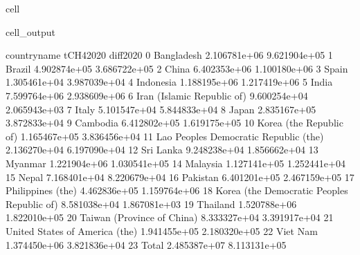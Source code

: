 \documentclass[letterpaper,10pt,english]{jupyterBook}
\begin{document}
\begin{sphinxuseclass}{cell}
\begin{sphinxVerbatimOutput}
\begin{sphinxuseclass}{cell_output}
\begin{sphinxVerbatim}[commandchars=\\\{\}]
                                   country\PYGZus{}name     tCH4\PYGZus{}2020     diff\PYGZus{}2020  \PYGZbs{}
0                                    Bangladesh  2.106781e+06 \PYGZhy{}9.621904e+05   
1                                        Brazil  4.902874e+05 \PYGZhy{}3.686722e+05   
2                                         China  6.402353e+06 \PYGZhy{}1.100180e+06   
3                                         Spain  1.305461e+04  3.987039e+04   
4                                     Indonesia  1.188195e+06  1.217419e+06   
5                                         India  7.599764e+06 \PYGZhy{}2.938609e+06   
6                    Iran (Islamic Republic of)  9.600254e+04 \PYGZhy{}2.065943e+03   
7                                         Italy  5.101547e+04  5.844833e+04   
8                                         Japan  2.835167e+05  3.872833e+04   
9                                      Cambodia  6.412802e+05 \PYGZhy{}1.619175e+05   
10                      Korea (the Republic of)  1.165467e+05  3.836456e+04   
11       Lao People\PYGZsq{}s Democratic Republic (the)  2.136270e+04  6.197090e+04   
12                                    Sri Lanka  9.248238e+04  1.856662e+04   
13                                      Myanmar  1.221904e+06 \PYGZhy{}1.030541e+05   
14                                     Malaysia  1.127141e+05  1.252441e+04   
15                                        Nepal  7.168401e+04  8.220679e+04   
16                                     Pakistan  6.401201e+05 \PYGZhy{}2.467159e+05   
17                            Philippines (the)  4.462836e+05  1.159764e+06   
18  Korea (the Democratic People\PYGZsq{}s Republic of)  8.581038e+04 \PYGZhy{}1.867081e+03   
19                                     Thailand  1.520788e+06  1.822010e+05   
20                   Taiwan (Province of China)  8.333327e+04 \PYGZhy{}3.391917e+04   
21               United States of America (the)  1.941455e+05  2.180320e+05   
22                                     Viet Nam  1.374450e+06 \PYGZhy{}3.821836e+04   
23                                        Total  2.485387e+07 \PYGZhy{}8.113131e+05   


\end{sphinxVerbatim}
\end{sphinxuseclass}
\end{sphinxVerbatimOutput}
\end{sphinxuseclass}
\end{document}
